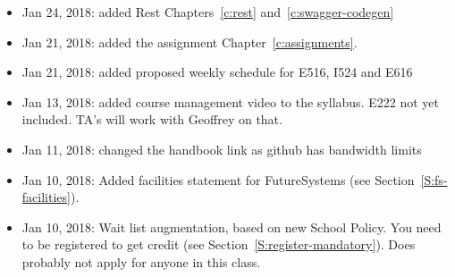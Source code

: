 \begin{itemize}
\item Jan 24, 2018: added Rest Chapters~\ref{c:rest}
  and~\ref{c:swagger-codegen}
 
\item Jan 21, 2018: added the assignment Chapter~\ref{c:assignments}.

\item Jan 21, 2018: added proposed weekly schedule for E516, I524 and
  E616

\item Jan 13, 2018: added course management video to the
  syllabus. E222 not yet included. TA's will work with Geoffrey on
  that.

\item Jan 11, 2018: changed the handbook link as github has bandwidth
  limits

\item Jan 10, 2018: Added facilities statement for FutureSystems (see
  Section~\ref{S:fs-facilities}).

\item Jan 10, 2018: Wait list augmentation, based on new School
  Policy. You need to be registered to get credit (see
  Section~\ref{S:register-mandatory}). Does probably not apply for
  anyone in this class.

\end{itemize}
